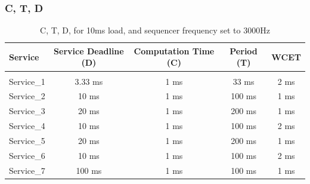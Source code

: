 \documentclass[a4paper,11pt]{article}%
\newenvironment{qanda}{\setlength{\parindent}{0pt}}{\bigskip}
\begin{document}
\begin{qanda}
	\subsubsection{C, T, D}
			\begin{table}[H]
				\centering
				\begin{tabular}{l c c c c}
					\hline
					\textbf{Service} & \textbf{Service	Deadline (D)} & \textbf{Computation Time (C)} & \textbf{Period (T)} & \textbf{WCET} \\\hline
					                 &                              &                                                                     \\
					Service\_1       & 3.33 ms                      & 1 ms                         & 33 ms              & 2 ms  \\
					Service\_2       & 10 ms                       & 1 ms                         & 100 ms             & 1 ms  \\
					Service\_3       & 20 ms                       & 1 ms                         & 200 ms             & 1 ms  \\
					Service\_4       & 10 ms                       & 1 ms                         & 100 ms             & 2 ms  \\
					Service\_5       & 20 ms                       & 1 ms                         & 200 ms             & 1 ms  \\
					Service\_6       & 10 ms                       & 1 ms                         & 100 ms             & 2 ms  \\
					Service\_7       & 100 ms                      & 1 ms                         & 100 ms             & 1 ms  \\

					\hline\hline
				\end{tabular}
				\caption{C, T, D, for 10ms load, and sequencer frequency set to 3000Hz}
			\end{table}



\end{qanda}
\end{document}
